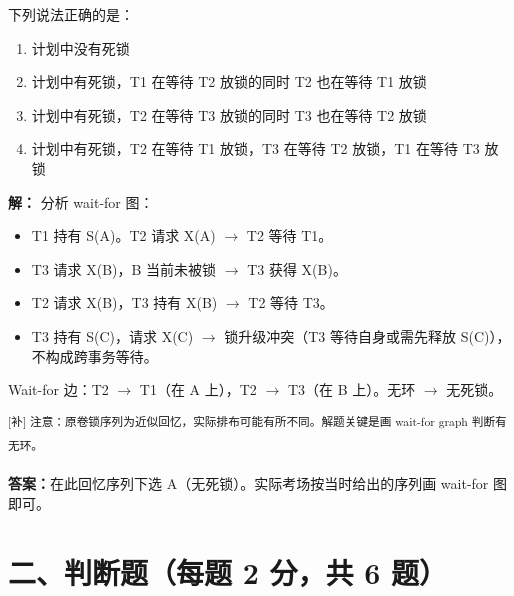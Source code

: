\documentclass[11pt,a4paper]{article}
\newcommand{\solution}{\par\noindent\textcolor{ansblue}{\textbf{解：}}}
\newcommand{\answer}{\par\noindent\textcolor{ansred}{\textbf{答案：}}}
\newcommand{\supp}[1]{\textcolor{ansred}{\textsuperscript{[补] #1}}}
\begin{document}
\begin{enumerate}[leftmargin=*,itemsep=8pt]
下列说法正确的是：

\begin{enumerate}[label=\Alph*.]
  \item 计划中没有死锁
  \item 计划中有死锁，T1 在等待 T2 放锁的同时 T2 也在等待 T1 放锁
  \item 计划中有死锁，T2 在等待 T3 放锁的同时 T3 也在等待 T2 放锁
  \item 计划中有死锁，T2 在等待 T1 放锁，T3 在等待 T2 放锁，T1 在等待 T3 放锁
\end{enumerate}

\solution
分析 wait-for 图：
\begin{itemize}[nosep]
  \item T1 持有 S(A)。T2 请求 X(A) $\to$ T2 等待 T1。
  \item T3 请求 X(B)，B 当前未被锁 $\to$ T3 获得 X(B)。
  \item T2 请求 X(B)，T3 持有 X(B) $\to$ T2 等待 T3。
  \item T3 持有 S(C)，请求 X(C) $\to$ 锁升级冲突（T3 等待自身或需先释放 S(C)），不构成跨事务等待。
\end{itemize}

Wait-for 边：T2 $\to$ T1（在 A 上），T2 $\to$ T3（在 B 上）。无环 $\to$ 无死锁。

\supp{注意：原卷锁序列为近似回忆，实际排布可能有所不同。解题关键是画 wait-for graph 判断有无环。}

\answer 在此回忆序列下选 A（无死锁）。实际考场按当时给出的序列画 wait-for 图即可。

\end{enumerate}

\newpage
\section*{二、判断题（每题 2 分，共 6 题）}
\end{document}
